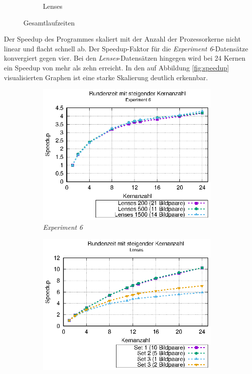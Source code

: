 \begin{center}
\begin{figure}
\begin{subfigure}[b]{0.49\textwidth}
			\caption[Lenses]{Lenses}
			\label{fig:times_lenses}
		\end{subfigure}
		\caption{Gesamtlaufzeiten}
		\label{fig:gesamtlaufzeiten}
	\end{figure}
\end{center}

Der Speedup des Programmes skaliert mit der Anzahl der Prozessorkerne nicht linear und flacht schnell ab. Der Speedup-Faktor für die \textit{Experiment 6}-Datensätze konvergiert gegen vier. Bei den \textit{Lenses}-Da\-ten\-sä\-tzen hingegen wird bei 24 Kernen ein Speedup von mehr als zehn erreicht. In den auf Abbildung \ref{fig:speedup} visualisierten Graphen ist eine starke Skalierung deutlich erkennbar. 

\begin{center}
	\begin{figure}
		\begin{subfigure}[b]{0.49\textwidth}
			\centering
			\includegraphics[width=\textwidth]{pdf/speedup_exp6}
			\caption{\textit{Experiment 6}}
			\label{fig:speedup_exp6}
		\end{subfigure}
		\hfill
		\begin{subfigure}[b]{0.49\textwidth}
			\centering
			\includegraphics[width=\textwidth]{pdf/speedup_lenses}

\end{subfigure}
\end{figure}
\end{center}
